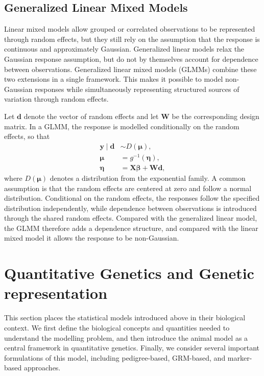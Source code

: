 \subsection{Generalized Linear Mixed Models}

Linear mixed models allow grouped or correlated observations to be represented through random effects, but they still rely on the assumption that the response is continuous and approximately Gaussian. Generalized linear models relax the Gaussian response assumption, but do not by themselves account for dependence between observations. Generalized linear mixed models (GLMMs) combine these two extensions in a single framework. This makes it possible to model non-Gaussian responses while simultaneously representing structured sources of variation through random effects.

Let $\mathbf{d}$ denote the vector of random effects and let $\mathbf{W}$ be the corresponding design matrix. In a GLMM, the response is modelled conditionally on the random effects, so that
%
\begin{align}
\mathbf{y} \mid \mathbf{d} &\sim D(\boldsymbol{\mu}), \\
\boldsymbol{\mu} &= g^{-1}(\boldsymbol{\eta}), \\
\boldsymbol{\eta} &= \mathbf{X}\boldsymbol{\beta} + \mathbf{W}\mathbf{d},
\end{align}
%
where $D(\boldsymbol{\mu})$ denotes a distribution from the exponential family. A common assumption is that the random effects are centered at zero and follow a normal distribution. Conditional on the random effects, the responses follow the specified distribution independently, while dependence between observations is introduced through the shared random effects. Compared with the generalized linear model, the GLMM therefore adds a dependence structure, and compared with the linear mixed model it allows the response to be non-Gaussian.


\section{Quantitative Genetics and Genetic representation}

This section places the statistical models introduced above in their biological context. We first define the biological concepts and quantities needed to understand the modelling problem, and then introduce the animal model as a central framework in quantitative genetics. Finally, we consider several important formulations of this model, including pedigree-based, GRM-based, and marker-based approaches.

